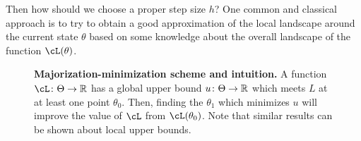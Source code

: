 \documentclass[../../book-main.tex]{subfiles}
\begin{document}
Then how should we choose a proper step size $h$? One common and classical approach is to try to obtain a good approximation of the local landscape around the current state $\theta$ based on some knowledge about the overall landscape of the function $\cL(\theta)$. 

\begin{figure}
    \centering 
    \caption{\small\textbf{Majorization-minimization scheme and intuition.} A function \(\cL \colon \Theta \to \R\) has a global upper bound \(u \colon \Theta \to \mathbb{R}\) which meets \(L\) at at least one point \(\theta_{0}\). Then, finding the \(\theta_{1}\) which minimizes \(u\) will improve the value of \(\cL\) from \(\cL(\theta_{0})\). Note that similar results can be shown about local upper bounds.}
    \label{fig:majorization_minimization}
\end{figure}
\end{document}
